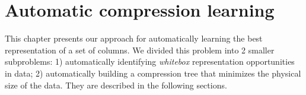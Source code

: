 
\chapter{Automatic compression learning}
\label{ch:automaticlearning}





% 

This chapter presents our approach for automatically learning the best representation of a set of columns. We divided this problem into 2 smaller subproblems: 1) automatically identifying \textit{whitebox} representation opportunities in data; 2) automatically building a compression tree that minimizes the physical size of the data. They are described in the following sections.







